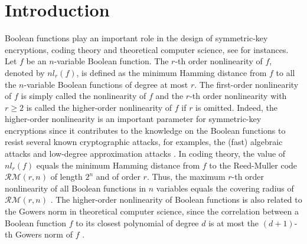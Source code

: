 \documentclass{article}
\newcommand{\0}{\textbf{0}}
\newcommand{\1}{\textbf{1}}
\theoremstyle{plain}
\begin{document}
\section{Introduction}
    Boolean functions play an important role in the design of symmetric-key encryptions, coding theory and theoretical computer science, see \cite{Carlet2020book,BhattacharyyaKSSZ2010gowers,CohenHLL1997RMcodecover} for instances.
    Let $f$ be an $n$-variable Boolean function. The $r$-th order nonlinearity of $f$, denoted by $nl_r(f)$, 
    is defined as the minimum Hamming distance from $f$ to all the $n$-variable Boolean functions of degree at most $r$.
    The first-order nonlinearity of $f$ is simply called the nonlinearity of $f$ and
    the $r$-th order nonlinearity with $r\ge 2$ is called the higher-order nonlinearity of $f$ if $r$ is omitted.
    Indeed, the higher-order nonlinearity is an important parameter for symmetric-key encryptions since
    it contributes to the knowledge on the Boolean functions  to resist  several known cryptographic attacks, for examples, 
    the (fast) algebraic attacks \cite{CM03,CFAA03,FAA06,WT10} and low-degree approximation attacks \cite{Golic1996lower_order_approximation,IwataK1999highorderbentfunction,KnudsenR1996nonlinear_approximation,Courtois2002XL_algorithm_and_NL_r}.
    In coding theory, the value of $nl_r(f)$ equals the minimum Hamming distance from $f$ to the Reed-Muller code $\mathcal{RM}(r,n)$ of length $2^n$ and of order $r$.
    Thus, the maximum $r$-th order nonlinearity of all Boolean functions in $n$ variables equals the covering radius of $\mathcal{RM}(r,n)$ \cite{CohenHLL1997RMcodecover}.
    The higher-order nonlinearity of Boolean functions is also related to the Gowers norm in theoretical computer science, since the correlation between a 
    Boolean function $f$ to its closest polynomial of degree $d$ is at most the $(d+1)$-th Gowers norm of $f$ \cite{BhattacharyyaKSSZ2010gowers}.
\end{document}
